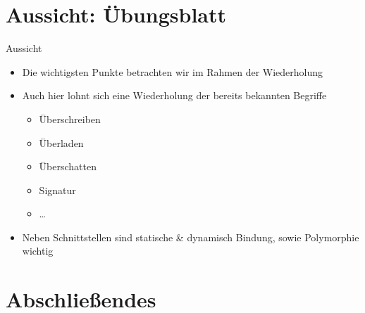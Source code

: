 \section[Aussicht: Übungsblatt \T{Integer.MAX\_VALUE}]{Aussicht: Übungsblatt \textbf{}}
\begin{frame}{Aussicht}
    \begin{itemize}[<+(1)->]
        \itemsep12pt
        \item Die wichtigsten Punkte betrachten wir im Rahmen der Wiederholung
        \item Auch hier lohnt sich eine Wiederholung der bereits bekannten Begriffe \begin{itemize}
            \item Überschreiben
            \item Überladen
            \item Überschatten
            \item Signatur
            \item \ldots
        \end{itemize}
        \item Neben Schnittstellen sind statische \& dynamisch Bindung, sowie Polymorphie wichtig
    \end{itemize}
\end{frame}
\fi

\section{Abschließendes}

